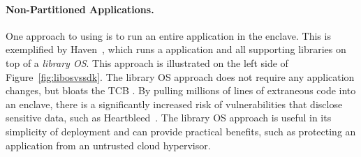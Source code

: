 


\paragraph{Non-Partitioned Applications.}
One approach to using \sgx{} is to run an entire application in the enclave.
This is exemplified by Haven~\cite{baumann14haven}, which runs a \win{} application and all supporting libraries
on top of a {\em library OS}.  This approach is illustrated on the left side of Figure~\ref{fig:libosvssdk}.
The library OS approach does not require any application changes, but bloats the TCB .
By pulling millions of lines of extraneous code into an enclave, there is a significantly increased risk 
of vulnerabilities that disclose
sensitive data, such as Heartbleed~.
The library OS approach is useful in its simplicity of deployment and can provide practical benefits, 
such as protecting an application from an untrusted cloud hypervisor.

